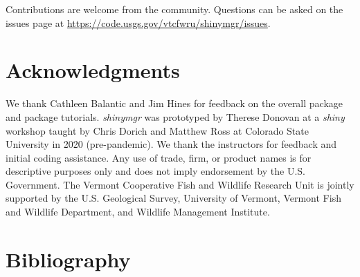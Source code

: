 Contributions are welcome from the community. Questions can be asked on the
issues page at \url{https://code.usgs.gov/vtcfwru/shinymgr/issues}.

\section{Acknowledgments}\label{acknowledgments}

We thank Cathleen Balantic and Jim Hines for feedback on the overall package and package tutorials. \emph{shinymgr} was prototyped by Therese Donovan at a \emph{shiny} workshop taught by Chris Dorich and Matthew Ross at Colorado State University in 2020 (pre-pandemic). We thank the instructors for feedback and initial coding assistance. Any use of trade, firm, or product names is for descriptive purposes only and does not imply endorsement by the U.S. Government. The Vermont Cooperative Fish and Wildlife Research Unit is jointly supported by the U.S. Geological Survey, University of Vermont, Vermont Fish and Wildlife Department, and Wildlife Management Institute.

\section{Bibliography}\label{bibliography}

